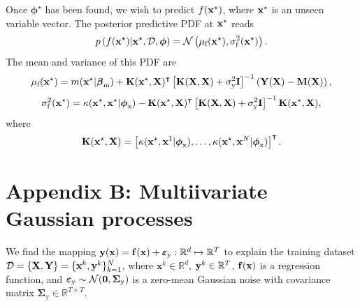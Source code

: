 \documentclass[journal ]{new-aiaa}
\begin{document}
Once ${\boldsymbol \phi^\star}$ has been found, we wish to predict $f({\bf x}^\star)$, where ${\bf x}^\star$ is an unseen variable vector.
The posterior predictive PDF at ${\bf x}^\star$ reads
\begin{equation}\label{eqnA5}
	p\left(f({\bf x}^\star)|{\bf x}^\star,\mathcal{D},\boldsymbol \phi\right) = \mathcal{N}\left(\mu_\text{f}({\bf x}^\star),\sigma_\text{f}^2({\bf x}^\star)\right).
\end{equation}
The mean and variance of this PDF are
\begin{equation}\label{eqnA6}
	\mu_\text{f}({\bf x}^\star)=m({\bf x}^\star|\boldsymbol \beta_{\text{m}}) 
	+ {\bf K}({\bf x}^\star,{\bf X})^\intercal \left[ {\bf K}({\bf X},{\bf X})+\sigma^2_\text{y} {\bf I}\right]^{-1} \left({\bf Y}({\bf X})-{\bf M} ({\bf X})\right),
\end{equation}
\begin{equation}\label{eqnA7}
	\sigma_\text{f}^2({\bf x}^\star)=\kappa({\bf x}^\star,{\bf x}^\star|\boldsymbol \phi_{\text{x}})
	-{\bf K}({\bf x}^\star,{\bf X})^\intercal \left[ {\bf K}({\bf X},{\bf X})+\sigma^2_\text{y} {\bf I}\right]^{-1} {\bf K}({\bf x}^\star,{\bf X}),
\end{equation}
where
\begin{equation}\label{eqnA8}
	{\bf K}({\bf x}^\star,{\bf X})= \left[\kappa({\bf x}^\star,{\bf x}^1|\boldsymbol \phi_{\text{x}}),\dots,\kappa({\bf x}^\star,{\bf x}^N|\boldsymbol \phi_{\text{x}})\right]^\intercal.
\end{equation}

\section*{Appendix B: Multiivariate Gaussian processes}\label{AppB}
\setcounter{equation}{0} %
\renewcommand{\theequation}{B.\arabic{equation}} %

We find the mapping ${\bf y}({\bf x})={\bf f}({\bf x}) + \boldsymbol{\varepsilon}_\text{y}: \mathbb{R}^d \mapsto \mathbb{R}^T$ to explain the training dataset $\mathcal{D}=\left\{ {\bf X},{\bf Y}\right\}=\{{\bf x}^k,{\bf y}^k\}_{k=1}^N$, where $\textbf{x}^k\in\mathbb{R}^d$, ${\bf y}^k\in\mathbb{R}^T$, ${\bf f}({\bf x})$ is a regression function, and $\boldsymbol{\varepsilon}_\text{y} \sim \mathcal{N}({\bf 0},\boldsymbol{\Sigma}_\text{y})$ is a zero-mean Gaussian noise with covariance matrix $\boldsymbol{\Sigma}_\text{y} \in \mathbb{R}^{T \times T}$.
\end{document}
